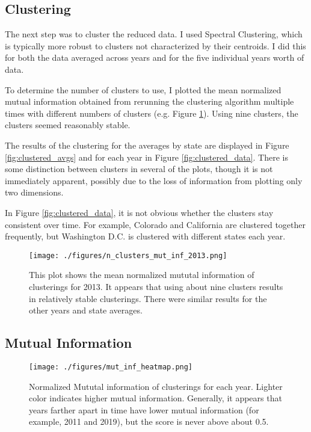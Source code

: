 \documentclass[11pt]{article}
\begin{document}
\subsection{Clustering}

The next step was to cluster the reduced data. I used Spectral Clustering, which is typically more robust to clusters not characterized by their centroids. I did this for both the data averaged across years and for the five individual years worth of data.

To determine the number of clusters to use, I plotted the mean normalized mutual information obtained from rerunning the clustering algorithm multiple times with different numbers of clusters (e.g. Figure \ref{fig:n_clusters}). Using nine clusters, the clusters seemed reasonably stable. 

The results of the clustering for the averages by state are displayed in Figure \ref{fig:clustered_avgs} and for each year in Figure \ref{fig:clustered_data}. There is some distinction between clusters in several of the plots, though it is not immediately apparent, possibly due to the loss of information from plotting only two dimensions.

In Figure \ref{fig:clustered_data}, it is not obvious whether the clusters stay consistent over time. For example, Colorado and California are clustered together frequently, but Washington D.C. is clustered with different states each year. 

\begin{figure}[htbp]
\centering
\texttt{[image: ./figures/n\_clusters\_mut\_inf\_2013.png]}
\caption{This plot shows the mean normalized mututal information of clusterings for 2013. It appears that using about nine clusters results in relatively stable clusterings. There were similar results for the other years and state averages.}
\label{fig:n_clusters}
\end{figure}

\subsection{Mutual Information}

\begin{figure}[htb]
\texttt{[image: ./figures/mut\_inf\_heatmap.png]}
\caption{Normalized Mututal information of clusterings for each year. Lighter color indicates higher mutual information. Generally, it appears that years farther apart in time have lower mutual information (for example, 2011 and 2019), but the score is never above about 0.5.}
\label{fig:mut_inf} 
\end{figure}
\end{document}
